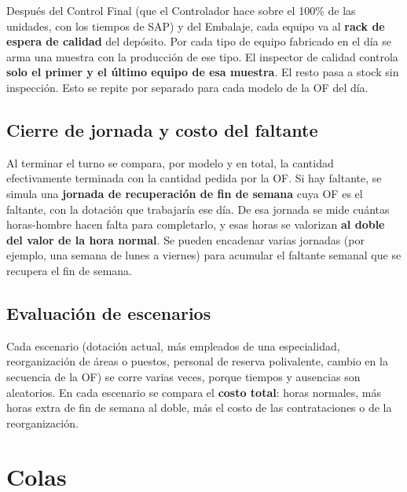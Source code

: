 \documentclass[11pt,a4paper]{article}
\begin{document}
Después del Control Final (que el Controlador hace sobre el 100\% de las unidades, con los tiempos de SAP) y del Embalaje, cada equipo va al \textbf{rack de espera de calidad} del depósito. Por cada tipo de equipo fabricado en el día se arma una muestra con la producción de ese tipo. El inspector de calidad controla \textbf{solo el primer y el último equipo de esa muestra}. El resto pasa a stock sin inspección. Esto se repite por separado para cada modelo de la OF del día.

\subsection{Cierre de jornada y costo del faltante}

Al terminar el turno se compara, por modelo y en total, la cantidad efectivamente terminada con la cantidad pedida por la OF. Si hay faltante, se simula una \textbf{jornada de recuperación de fin de semana} cuya OF es el faltante, con la dotación que trabajaría ese día. De esa jornada se mide cuántas horas-hombre hacen falta para completarlo, y esas horas se valorizan \textbf{al doble del valor de la hora normal}. Se pueden encadenar varias jornadas (por ejemplo, una semana de lunes a viernes) para acumular el faltante semanal que se recupera el fin de semana.

\subsection{Evaluación de escenarios}

Cada escenario (dotación actual, más empleados de una especialidad, reorganización de áreas o puestos, personal de reserva polivalente, cambio en la secuencia de la OF) se corre varias veces, porque tiempos y ausencias son aleatorios. En cada escenario se compara el \textbf{costo total}: horas normales, más horas extra de fin de semana al doble, más el costo de las contrataciones o de la reorganización.

\section{Colas}
\end{document}
